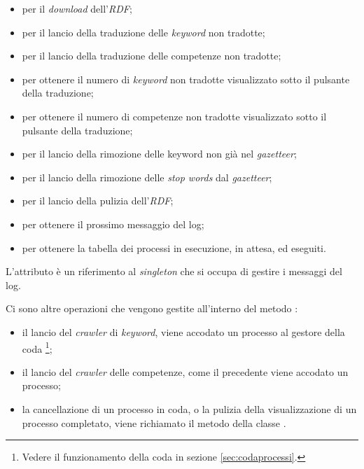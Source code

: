 \documentclass[tesi.tex]{subfiles}
\begin{document}
\begin{itemize}
\item {} per il \emph{download} dell'\emph{RDF}; 
\item {} per il lancio della traduzione delle
  \emph{keyword} non tradotte;
\item {} per il lancio della traduzione delle
  competenze non tradotte;
\item {} per ottenere il numero di
  \emph{keyword} non tradotte visualizzato sotto il pulsante della
  traduzione;
\item {} per ottenere il numero di
  competenze non tradotte visualizzato sotto il pulsante della
  traduzione;
\item {} per il lancio della rimozione delle
  keyword non gi\`a nel \emph{gazetteer};
\item {} per il lancio della rimozione delle
  \emph{stop words} dal \emph{gazetteer};
\item {} per il lancio della pulizia
  dell'\emph{RDF};
\item {} per ottenere il prossimo messaggio del
  log;
\item {} per ottenere la tabella dei processi in
  esecuzione, in attesa, ed eseguiti.
\end{itemize}

L'attributo  \`e un riferimento al
\emph{singleton} che si occupa di gestire i messaggi del log.

Ci sono altre operazioni che vengono gestite all'interno del
metodo :
\begin{itemize}
\item il lancio del \emph{crawler} di \emph{keyword}, viene accodato un
  processo al gestore della coda \footnote{Vedere
    il funzionamento della coda in sezione \ref{sec:codaprocessi}.};
\item il lancio del \emph{crawler} delle competenze, come il
  precedente viene accodato un processo;
\item la cancellazione di un processo in coda, o la pulizia della visualizzazione di un
  processo completato, viene richiamato il metodo 
  della classe .
\end{itemize}
\end{document}
